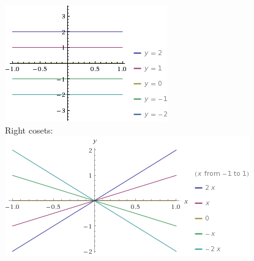 \documentclass[12pt]{article}
\begin{document}
\begin{itemize}
\includegraphics[scale=2.0]{12-1} \\
Right cosets: \\
\includegraphics[scale=1.5]{12-2}
\end{itemize}
\end{document}
